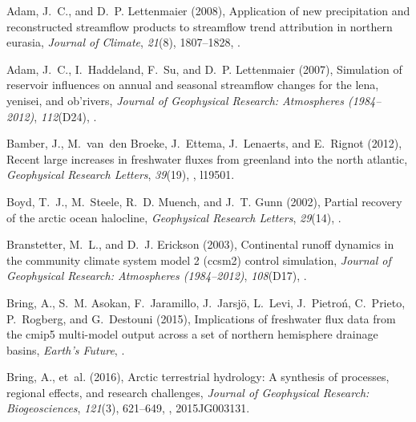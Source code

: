 \documentclass[jgrga, draft]{agutex}
\begin{document}
\begin{article}
\begin{thebibliography}{79}
Adam, J.~C., and D.~P. Lettenmaier (2008), Application of new precipitation and
  reconstructed streamflow products to streamflow trend attribution in northern
  eurasia, \textit{Journal of Climate}, \textit{21}(8), 1807--1828,
  .

Adam, J.~C., I.~Haddeland, F.~Su, and D.~P. Lettenmaier (2007), Simulation of
  reservoir influences on annual and seasonal streamflow changes for the lena,
  yenisei, and ob'rivers, \textit{Journal of Geophysical Research: Atmospheres
  (1984--2012)}, \textit{112}(D24), .

Bamber, J., M.~van~den Broeke, J.~Ettema, J.~Lenaerts, and E.~Rignot (2012),
  Recent large increases in freshwater fluxes from greenland into the north
  atlantic, \textit{Geophysical Research Letters}, \textit{39}(19),
  , l19501.

Boyd, T.~J., M.~Steele, R.~D. Muench, and J.~T. Gunn (2002), Partial recovery
  of the arctic ocean halocline, \textit{Geophysical Research Letters},
  \textit{29}(14), .

Branstetter, M.~L., and D.~J. Erickson (2003), Continental runoff dynamics in
  the community climate system model 2 (ccsm2) control simulation,
  \textit{Journal of Geophysical Research: Atmospheres (1984--2012)},
  \textit{108}(D17), .

Bring, A., S.~M. Asokan, F.~Jaramillo, J.~Jarsj{\"o}, L.~Levi, J.~Pietro{\'n},
  C.~Prieto, P.~Rogberg, and G.~Destouni (2015), Implications of freshwater
  flux data from the cmip5 multi-model output across a set of northern
  hemisphere drainage basins, \textit{Earth's Future},
  .

Bring, A., et~al. (2016), Arctic terrestrial hydrology: A synthesis of
  processes, regional effects, and research challenges, \textit{Journal of
  Geophysical Research: Biogeosciences}, \textit{121}(3), 621--649,
  , 2015JG003131.


\end{thebibliography}
\end{article}
\end{document}
